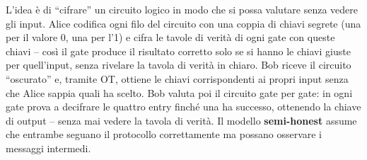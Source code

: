 \documentclass[a4paper,11pt]{article}
\begin{document}
\begin{nota}
L'idea è di ``cifrare'' un circuito logico in modo che si possa valutare senza vedere gli input. Alice codifica ogni filo del circuito con una coppia di chiavi segrete (una per il valore 0, una per l'1) e cifra le tavole di verità di ogni gate con queste chiavi -- così il gate produce il risultato corretto solo se si hanno le chiavi giuste per quell'input, senza rivelare la tavola di verità in chiaro. Bob riceve il circuito ``oscurato'' e, tramite OT, ottiene le chiavi corrispondenti ai propri input senza che Alice sappia quali ha scelto. Bob valuta poi il circuito gate per gate: in ogni gate prova a decifrare le quattro entry finché una ha successo, ottenendo la chiave di output -- senza mai vedere la tavola di verità. Il modello \textbf{semi-honest} assume che entrambe seguano il protocollo correttamente ma possano osservare i messaggi intermedi.
\end{nota}
\end{document}
